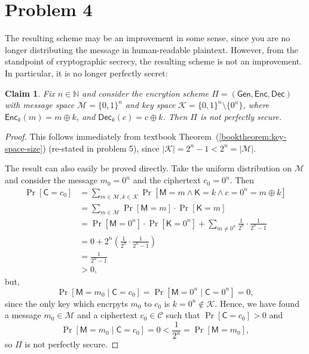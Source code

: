 \documentclass[12pt]{article}
\numberwithin{equation}{section}
\theoremstyle{plain}
\newtheorem{claim}{Claim}
\newcommand{\set}[1]{\{ #1 \}}
\DeclareMathOperator*{\prob}{Pr}
\newcommand{\given}{\mid}
\newcommand{\ctexts}{\mathcal{C}}
\newcommand{\ctext}{\algo{C}}
\newcommand{\ptexts}{\mathcal{M}}
\newcommand{\ptext}{\algo{M}}
\newcommand{\keys}{\mathcal{K}}
\newcommand{\key}{\algo{K}}
\newcommand{\algo}[1]{\mathsf{#1}}
\newcommand{\gen}{\algo{Gen}}
\newcommand{\enc}{\algo{Enc}}
\newcommand{\dec}{\algo{Dec}}
\begin{document}
\section*{Problem 4}

The resulting scheme may be an improvement in some sense,
since you are no longer distributing the message in human-readable plaintext.
However, from the standpoint of cryptographic secrecy,
the resulting scheme is not an improvement.
In particular, it is no longer perfectly secret:
\begin{claim}
Fix $n \in \mathbb{N}$ and consider the encrytion scheme $\Pi = (\gen, \enc, \dec)$
with message space $\ptexts = \set{ 0, 1 }^n$ and key space $\keys = \set{0, 1}^n \setminus \set{0^n}$,
where $\enc_k(m) = m \oplus k$,
and $\dec_k(c) = c \oplus k$.
Then $\Pi$ is not perfectly secure.
\end{claim}
\begin{proof}
This follows immediately from textbook Theorem~(\ref{booktheorem:key-space-size}) (re-stated in problem 5),
since $|\keys| = 2^n - 1 < 2^n = |\ptexts|$.

The result can also easily be proved directly.
Take the uniform distribution on $\ptexts$
and consider the message $m_0 = 0^n$ and the ciphertext $c_0 = 0^n$.
Then
\begin{align*}
    \prob[\ctext = c_0]
        &= \sum_{m \in \ptexts, k \in \keys}{ \prob[\ptext = m \wedge \key = k \wedge c = 0^n = m \oplus k] }\\
        &= \sum_{m \in \ptexts}{ \prob[\ptext = m] \cdot \prob[\key = m] }\\
        &= \prob[\ptext = 0^n]\cdot \prob[\key = 0^n] + \sum_{m \neq 0^n}{ \frac{1}{2^n} \cdot \frac{1}{2^n - 1} }\\
        &= 0 + 2^n (\frac{1}{2^n} \cdot \frac{1}{2^n - 1})\\
        &= \frac{1}{2^n - 1}\\
        &> 0,
\end{align*}
but,
\begin{equation*}
    \prob[\ptext = m_0 \given \ctext = c_0] = \prob[\ptext = 0^n \given \ctext = 0^n] = 0,
\end{equation*}
since the only key which encrpyts $m_0$ to $c_0$ is $k = 0^n \not\in \keys$.
Hence, we have found a message $m_0 \in \ptexts$
and a ciphertext $c_0 \in \ctexts$
such that $\prob[\ctext = c_0] > 0$
and
\begin{equation*}
    \prob[\ptext = m_0 \given \ctext = c_0] = 0 < \frac{1}{2^n} = \prob[\ptext = m_0],
\end{equation*}
so $\Pi$ is not perfectly secure.
\end{proof}
\end{document}
